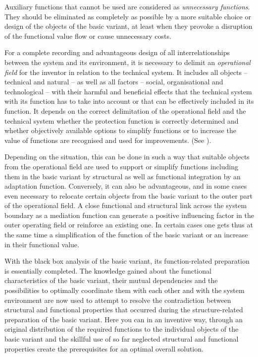 \documentclass[11pt,a4paper]{article}
\begin{document}
Auxiliary functions that cannot be used are considered as \emph{unnecessary
  functions}.  They should be eliminated as completely as possible by a more
suitable choice or design of the objects of the basic variant, at least when
they provoke a disruption of the functional value flow or cause unnecessary
costs.

For a complete recording and advantageous design of all interrelationships
between the system and its environment, it is necessary to delimit an
\emph{operational field} for the inventor in relation to the technical system.
It includes all objects -- technical and natural -- as well as all factors --
social, organisational and technological -- with their harmful and beneficial
effects that the technical system with its function has to take into account
or that can be effectively included in its function. It depends on the correct
delimitation of the operational field and the technical system whether the
protection function is correctly determined and whether objectively available
options to simplify functions or to increase the value of functions are
recognised and used for improvements. (See \cite[A.3]{RM-21}).

Depending on the situation, this can be done in such a way that suitable
objects from the operational field are used to support or simplify functions
including them in the basic variant by structural as well as functional
integration by an adaptation function.  Conversely, it can also be
advantageous, and in some cases even necessary to relocate certain objects
from the basic variant to the outer part of the operational field. A close
functional and structural link across the system boundary as a mediation
function can generate a positive influencing factor in the outer operating
field or reinforce an existing one. In certain cases one gets thus at the same
time a simplification of the function of the basic variant or an increase in
their functional value.

With the black box analysis of the basic variant, its function-related
preparation is essentially completed. The knowledge gained about the
functional characteristics of the basic variant, their mutual dependencies and
the possibilities to optimally coordinate them with each other and with the
system environment are now used to attempt to resolve the contradiction
between structural and functional properties that occurred during the
structure-related preparation of the basic variant.  Here you can in an
inventive way, through an original distribution of the required functions to
the individual objects of the basic variant and the skillful use of so far
neglected structural and functional properties create the prerequisites for an
optimal overall solution.
\end{document}
